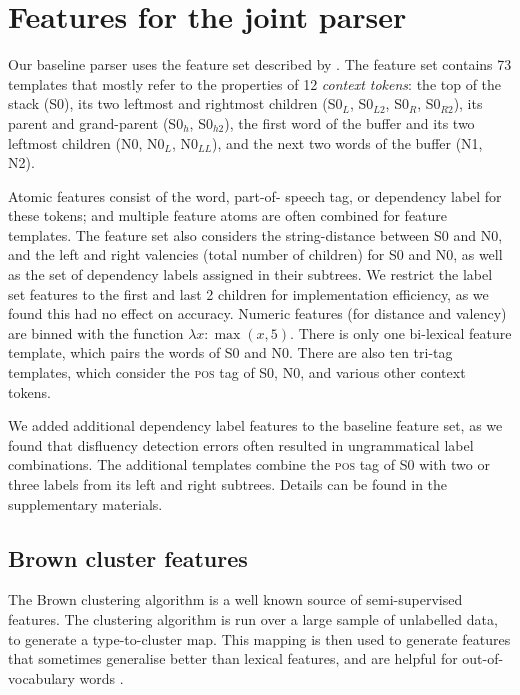 \documentclass[11pt,letterpaper]{article}
\newcommand{\pos}{\textsc{pos}\xspace}
\newcommand{\szero}{S0\xspace}
\newcommand{\nzero}{N0\xspace}
\newcommand{\szeroH}{S0$_h$\xspace}
\newcommand{\szeroHH}{S0$_{h2}$\xspace}
\newcommand{\szeroL}{S0$_L$\xspace}
\newcommand{\szeroLL}{S0$_{L2}$\xspace}
\newcommand{\szeroR}{S0$_R$\xspace}
\newcommand{\szeroRR}{S0$_{R2}$\xspace}
\newcommand{\nzeroL}{N0$_L$\xspace}
\newcommand{\nzeroLL}{N0$_{LL}$\xspace}
\begin{document}
\section{Features for the joint parser}
\label{sec:features}

Our baseline parser uses the feature set described by \citet{zhang:11}.
The feature set contains 73 templates that mostly refer to the properties of
12 \emph{context tokens}: the top of the stack (\szero), its two leftmost and
rightmost children (\szeroL, \szeroLL, \szeroR, \szeroRR), its parent and
grand-parent (\szeroH, \szeroHH), the first word of the buffer and its two leftmost
children (\nzero, \nzeroL, \nzeroLL), and the next two words of the buffer (N1, N2).

Atomic features consist of the word, part-of- speech tag, or dependency label
for these tokens; and multiple feature atoms are often combined for feature
templates. The feature set also considers the string-distance between \szero
and \nzero, and the left and right valencies
(total number of children) for \szero and \nzero, as well as the set of dependency
labels assigned in their subtrees. We restrict the label set features
to the first and last 2 children for implementation efficiency, as we found this
had no effect on accuracy. Numeric features (for distance and valency) are binned
with the function $\lambda x: \max(x, 5)$.
There is only one bi-lexical feature template, which pairs
the words of \szero and \nzero.
There are also ten tri-tag templates, which consider the
\pos tag of \szero, \nzero, and various other context tokens.

We added additional dependency label features to the baseline feature
set, as we found that disfluency detection errors often resulted in ungrammatical
label combinations.  The additional templates combine the \pos tag of \szero with
two or three labels from its left and right subtrees.  Details can be found in
the supplementary materials.

\subsection{Brown cluster features}

The Brown clustering algorithm \citep{brown:92} is a well known source
of semi-supervised features. The clustering algorithm is run over a large sample
of unlabelled data, to generate a type-to-cluster map. This mapping is then used
to generate features that sometimes generalise better than lexical features,
and are helpful for out-of-vocabulary words \citep{turian:10}.
\end{document}
